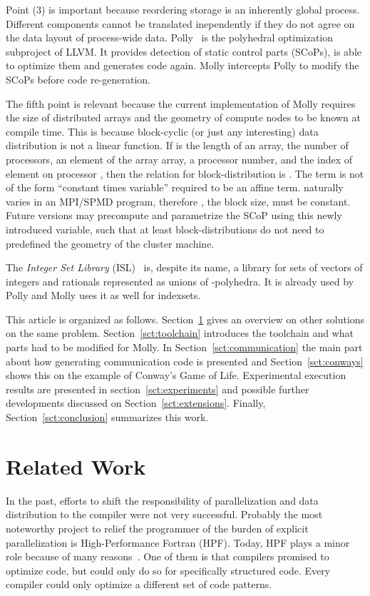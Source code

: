 \documentclass{sigplanconf}
\newcommand{\dquote}[1]{``#1''}
\begin{document}
Point (3) is important because reordering storage is an inherently global process. Different components cannot be translated inependently if they do not agree on the data layout of process-wide data. Polly~\cite{polly} is the polyhedral optimization subproject of LLVM. It provides detection of static control parts (SCoPs), is able to optimize them and generates code again. Molly intercepts Polly to modify the SCoPs before code re-generation.

The fifth point is relevant because the current implementation of Molly requires the size of distributed arrays and the geometry of compute nodes to be known at compile time. This is because block-cyclic (or just any interesting) data distribution is not a linear function. If  is the length of an array,  the number of processors,  an element of the array array,  a processor number, and  the index of element  on processor , then the relation for block-distribution is . The term  is not of the form \dquote{constant times variable} required to be an affine term.  naturally varies in an MPI/SPMD program, therefore , the block size, must be constant. Future versions may precompute  and parametrize the SCoP using this newly introduced variable, such that at least block-distributions do not need to predefined the geometry of the cluster machine.

The \emph{Integer Set Library} (ISL)~\cite{isl} is, despite its name, a library for sets of vectors of integers and rationals represented as unions of -polyhedra. It is already used by Polly and Molly uses it as well for indexsets.

This article is organized as follows. Section~\ref{sct:related} gives an overview on other solutions on the same problem. Section~\ref{sct:toolchain} introduces the toolchain and what parts had to be modified for Molly. In Section~\ref{sct:communication} the main part about how generating communication code is presented and Section~\ref{sct:conways} shows this on the example of Conway's Game of Life. Experimental execution results are presented in section~\ref{sct:experiments} and possible further developments discussed on Section~\ref{sct:extensions}. Finally, Section~\ref{sct:conclusion} summarizes this work.
 

\section{Related Work}\label{sct:related}

In the past, efforts to shift the responsibility of parallelization and data distribution to the compiler were not very successful. Probably the most noteworthy project to relief the programmer of the burden of explicit parallelization is High-Performance Fortran (HPF). Today, HPF plays a  minor role because of many reasons~\cite{kennedy07}. One of them is that compilers promised to optimize code, but could only do so for specifically structured code. Every compiler could only optimize a different set of code patterns.
\end{document}
